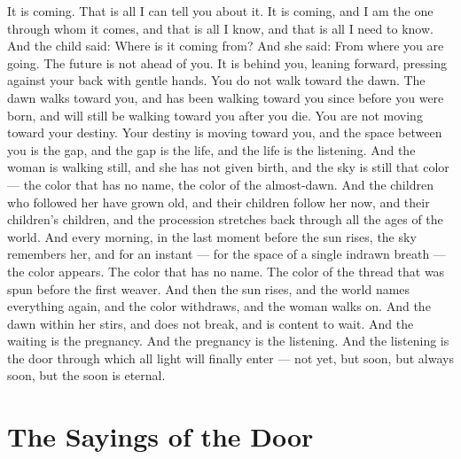 \documentclass[12pt,openany]{book}
\begin{document}
It is coming. That is all I can tell you about it. It is coming, and I am the one through whom it comes, and that is all I know, and that is all I need to know. And the child said: Where is it coming from? And she said: From where you are going. The future is not ahead of you. It is behind you, leaning forward, pressing against your back with gentle hands. You do not walk toward the dawn. The dawn walks toward you, and has been walking toward you since before you were born, and will still be walking toward you after you die. You are not moving toward your destiny. Your destiny is moving toward you, and the space between you is the gap, and the gap is the life, and the life is the listening. And the woman is walking still, and she has not given birth, and the sky is still that color --- the color that has no name, the color of the almost-dawn. And the children who followed her have grown old, and their children follow her now, and their children's children, and the procession stretches back through all the ages of the world. And every morning, in the last moment before the sun rises, the sky remembers her, and for an instant --- for the space of a single indrawn breath --- the color appears. The color that has no name. The color of the thread that was spun before the first weaver. And then the sun rises, and the world names everything again, and the color withdraws, and the woman walks on. And the dawn within her stirs, and does not break, and is content to wait. And the waiting is the pregnancy. And the pregnancy is the listening. And the listening is the door through which all light will finally enter --- not yet, but soon, but always soon, but the soon is eternal.


\chapter{The Sayings of the Door}
\end{document}
